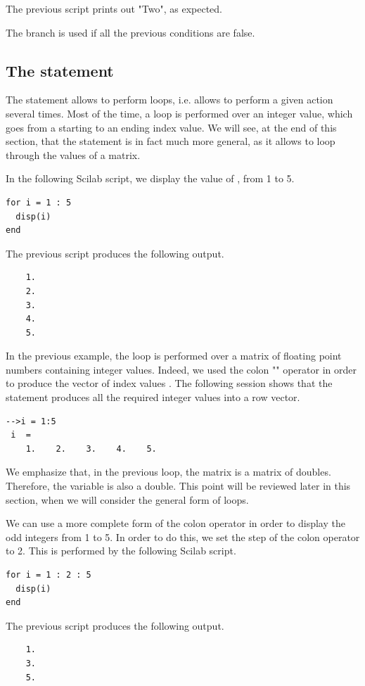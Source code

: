 The previous script prints out "Two", as expected.

The  branch is used if all the previous 
 conditions are false. 


\subsection{The  statement}

The  statement allows to perform 
loops, i.e. allows to perform a given action several 
times. Most of the time, a loop is performed over an integer value, which 
goes from a starting to an ending index value.
We will see, at the end of this section, that the 
statement is in fact much more general, as it allows to loop 
through the values of a matrix.

In the following Scilab script, we display the value of 
, from 1 to 5.
\lstset{language=scilabscript}
\begin{lstlisting}
for i = 1 : 5
  disp(i)
end
\end{lstlisting}
The previous script produces the following output.
\lstset{language=scilabscript}
\begin{lstlisting}
    1.  
    2.  
    3.  
    4.  
    5.  
\end{lstlisting}

In the previous example, the loop is performed over a matrix of floating 
point numbers containing integer values. 
Indeed, we used the colon "\scivar{:}" operator in order to produce the vector of index values  
\scivar{[1 2 3 4 5]}.
The following session shows that the statement 
produces all the required integer values into a row vector.
\lstset{language=scilabscript}
\begin{lstlisting}
-->i = 1:5
 i  =
    1.    2.    3.    4.    5.  
\end{lstlisting}

We emphasize that, in the previous loop, the matrix 
is a matrix of doubles. Therefore, the variable  is also 
a double. This point will be reviewed later in this section, when 
we will consider the general form of  loops.

We can use a more complete form of the colon operator
in order to display the odd integers from 1 to 5.
In order to do this, we set the step of the colon operator to 2. 
This is performed by the following Scilab script.
\lstset{language=scilabscript}
\begin{lstlisting}
for i = 1 : 2 : 5
  disp(i)
end
\end{lstlisting}
The previous script produces the following output.
\lstset{language=scilabscript}
\begin{lstlisting}
    1.  
    3.  
    5.  
\end{lstlisting}

